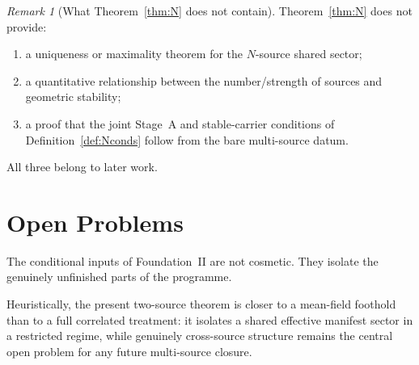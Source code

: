 \documentclass[12pt]{article}
\theoremstyle{definition}
\theoremstyle{remark}
\newtheorem{remark}[theorem]{Remark}
\begin{document}
\begin{remark}[What Theorem~\ref{thm:N} does not contain]
Theorem~\ref{thm:N} does not provide:
\begin{enumerate}
\item a uniqueness or maximality theorem for the \(N\)-source shared
  sector;
\item a quantitative relationship between the number/strength of sources
  and geometric stability;
\item a proof that the joint Stage~A and stable-carrier conditions of
  Definition~\ref{def:Nconds} follow from the bare multi-source datum.
\end{enumerate}
All three belong to later work.
\end{remark}

\section{Open Problems}\label{sec:open}

The conditional inputs of Foundation~II are not cosmetic. They isolate
the genuinely unfinished parts of the programme.

Heuristically, the present two-source theorem is closer to a
mean-field foothold than to a full correlated treatment: it isolates a
shared effective manifest sector in a restricted regime, while genuinely
cross-source structure remains the central open problem for any future
multi-source closure.
\end{document}
